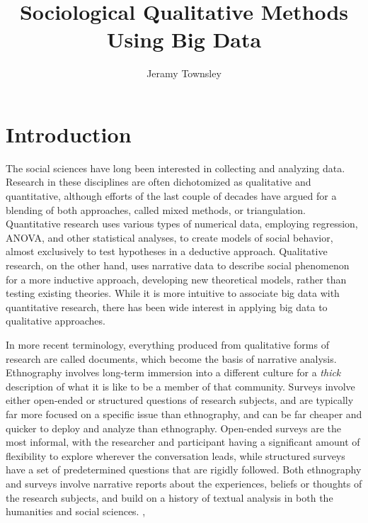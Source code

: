 \documentclass[sigconf]{acmart}
\begin{document}
\title{Sociological Qualitative Methods Using Big Data}


\author{Jeramy Townsley}




\begin{abstract}

\end{abstract}


\maketitle

\section{Introduction}
The social sciences have long been interested in collecting and analyzing data.  Research in these disciplines are often dichotomized as qualitative and quantitative, although efforts of the last couple of decades have argued for a blending of both approaches, called mixed methods, or triangulation.  Quantitative research uses various types of numerical data, employing regression, ANOVA, and other statistical analyses, to create models of social behavior, almost exclusively to test hypotheses in a deductive approach.  Qualitative research, on the other hand, uses narrative data to describe social phenomenon for a more inductive approach, developing new theoretical models, rather than testing existing theories. \cite{bryman16} While it is more intuitive to associate big data with quantitative research, there has been wide interest in applying big data to qualitative approaches.

In more recent terminology, everything produced from qualitative forms of research are called documents, which become the basis of narrative analysis.  Ethnography involves long-term immersion into a different culture for a {\em thick} description of what it is like to be a member of that community.  Surveys involve either open-ended or structured questions of research subjects, and are typically far more focused on a specific issue than ethnography, and can be far cheaper and quicker to deploy and analyze than ethnography.  Open-ended surveys are the most informal, with the researcher and participant having a significant amount of flexibility to explore wherever the conversation leads, while structured surveys have a set of predetermined questions that are rigidly followed.  Both ethnography and surveys involve narrative reports about the experiences, beliefs or thoughts of the research subjects, and build on a history of textual analysis in both the humanities and social sciences. \cite{bryman16}, \cite{singleton18}
\end{document}
